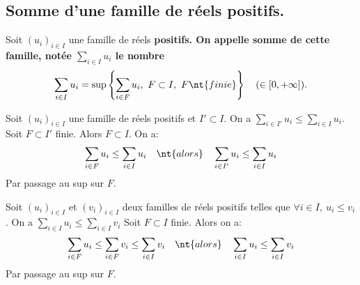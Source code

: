 \documentclass[11pt]{article}
\begin{document}
\subsection{Somme d'une famille de réels positifs.}

\begin{defi}{}{}
    Soit $(u_i)_{i\in I}$ une famille de réels \bf{positifs}. On appelle \bf{somme} de cette famille, notée $\sum_{i\in I}u_i$ le nombre
    \begin{equation*}
        \sum_{i\in I}u_i=\sup\left\{\sum_{i\in F}u_i, ~ F\subset I, ~ F \nt{ finie}\right\} \quad (\in[0,+\infty]).
    \end{equation*}
\end{defi}

\begin{prop}{}{}
    Soit $(u_i)_{i\in I}$ une famille de réels positifs et $I'\subset I$. On a \large$\sum\limits_{i\in I'}u_i\leq \sum\limits_{i\in I}u_i$.
    \tcblower
    Soit $F\subset I'$ finie. Alors $F\subset I$. On a: 
    \begin{equation*}
        \sum_{i\in F}u_i\leq \sum_{i\in I}u_i\quad\nt{alors}\quad\sum_{i\in I'}u_i \leq \sum_{i\in I}u_i
    \end{equation*}
    Par passage au sup sur $F$.
\end{prop}

\begin{prop}{}{}
    Soit $(u_i)_{i\in I}$ et $(v_i)_{i\in I}$ deux familles de réels positifs telles que $\forall i \in I,~u_i\leq v_i$. On a \large$\sum_{i\in I}u_i\leq\sum_{i\in I}v_i$
    \tcblower
    Soit $F\subset I$ finie. Alors on a:
    \begin{equation*}
        \sum_{i\in F}u_i\leq\sum_{i\in F}v_i\leq\sum_{i\in I}v_i\quad\nt{alors}\quad\sum_{i\in I}u_i\leq\sum_{i\in I}v_i
    \end{equation*}
    Par passage au sup sur $F$.
\end{prop}
\end{document}
